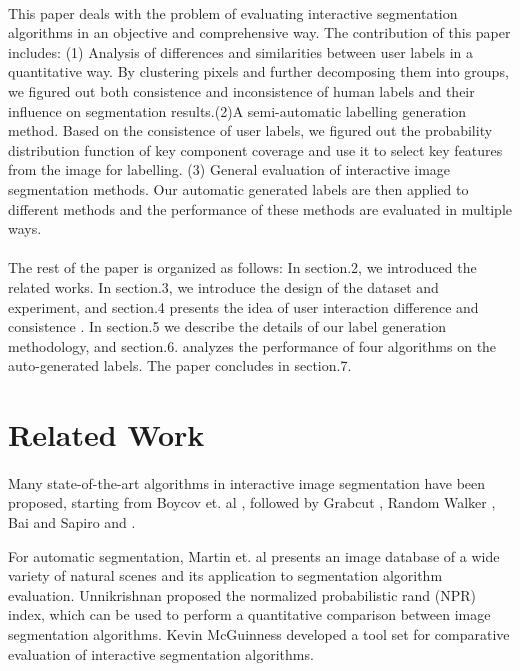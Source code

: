\documentclass[runningheads,a4paper]{llncs}
\begin{document}
\paragraph{}This paper deals with the problem of evaluating interactive segmentation algorithms in an objective and comprehensive way. The contribution of this paper includes: (1)  Analysis of differences and similarities between user labels in a quantitative way. By clustering pixels and further decomposing them into groups, we figured out both consistence and inconsistence of human labels and their influence on segmentation results.(2)A semi-automatic labelling generation method. Based on the consistence of user labels, we figured out the probability distribution function of key component coverage and use it to select key features from the image for labelling. (3) General evaluation of interactive image segmentation methods. Our automatic generated labels are then applied to different methods and the performance of these methods are evaluated in multiple ways.

\paragraph{}The rest of the paper is organized as follows: In section.2, we introduced the related works. In section.3, we introduce the design of the dataset and experiment, and section.4 presents the idea of user interaction difference and consistence . In section.5 we describe the details of our label generation methodology, and section.6. analyzes the performance of four algorithms on the auto-generated labels. The paper concludes in section.7.

\section{Related Work}

\paragraph{}Many state-of-the-art algorithms in interactive image segmentation have been proposed, starting from Boycov et. al \citep{boykov2001interactive}, followed by Grabcut \citep{rother2004grabcut}, Random Walker \citep{grady2006random}, Bai and Sapiro \citep{bai2007geodesic} and \citep{gulshan2010geodesic}.

For automatic segmentation, Martin et. al  \citep{martin2001database} presents an image database of a wide variety of natural scenes and its application to segmentation algorithm evaluation.  Unnikrishnan \citep{unnikrishnan2007toward} proposed the normalized probabilistic rand (NPR) index, which can be used to perform a quantitative comparison between image segmentation algorithms. Kevin McGuinness \citep{mcguinness2010comparative} developed a tool set for comparative evaluation of interactive segmentation algorithms.
\end{document}
